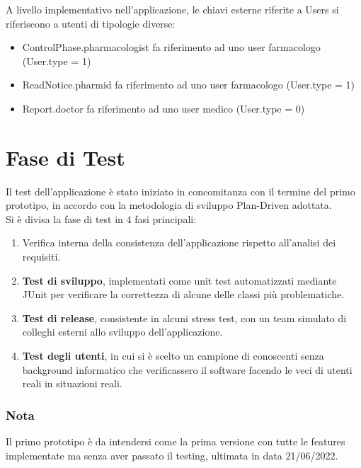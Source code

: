 \documentclass[11pt]{article}
\begin{document}
    A livello implementativo nell'applicazione, le chiavi esterne riferite a Users si riferiscono a utenti di tipologie diverse:
        \begin{itemize}
            \item ControlPhase.pharmacologist fa riferimento ad uno user farmacologo (User.type = 1)
            \item ReadNotice.pharmid fa riferimento ad uno user farmacologo (User.type = 1)
            \item Report.doctor fa riferimento ad uno user medico (User.type = 0)
        \end{itemize}

\newpage
    \section{Fase di Test}
    Il test dell'applicazione è stato iniziato in concomitanza con il termine del primo prototipo, in accordo con la metodologia di sviluppo Plan-Driven adottata.\\
    Si è divisa la fase di test in 4 fasi principali:
        \begin{enumerate}
            \item Verifica interna della consistenza dell'applicazione rispetto all'analisi dei requisiti.
            \item \textbf{Test di sviluppo}, implementati come unit test automatizzati mediante JUnit per verificare la correttezza di
            alcune delle classi più problematiche.
            \item \textbf{Test di release}, consistente in alcuni stress test, con un team simulato di colleghi esterni allo sviluppo dell'applicazione.
            \item \textbf{Test degli utenti}, in cui si è scelto un campione di conoscenti senza background informatico che verificassero il software facendo le veci di utenti reali in situazioni reali.
        \end{enumerate}
    
        \subsubsection*{Nota}
        Il primo prototipo è da intendersi come la prima versione con tutte le features implementate ma senza aver passato il testing, ultimata in data 21/06/2022.
\end{document}
